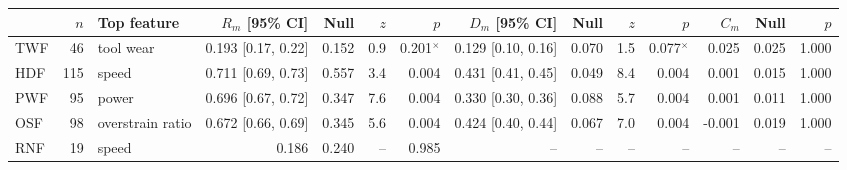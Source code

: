 \begin{tabular}{@{}lrlrrrrrrrrrrr@{}}
\toprule
& $n$ & Top feature & $R_m$ [95\% CI] & Null & $z$ & $p$ & $D_m$ [95\% CI] & Null & $z$ & $p$ & $C_m$ & Null & $p$ \\
\midrule
TWF & 46 & tool wear & 0.193 [0.17, 0.22] & 0.152 & 0.9 & 0.201$^{\times}$ & 0.129 [0.10, 0.16] & 0.070 & 1.5 & 0.077$^{\times}$ & 0.025 & 0.025 & 1.000 \\
HDF & 115 & speed & 0.711 [0.69, 0.73] & 0.557 & 3.4 & 0.004 & 0.431 [0.41, 0.45] & 0.049 & 8.4 & 0.004 & 0.001 & 0.015 & 1.000 \\
PWF & 95 & power & 0.696 [0.67, 0.72] & 0.347 & 7.6 & 0.004 & 0.330 [0.30, 0.36] & 0.088 & 5.7 & 0.004 & 0.001 & 0.011 & 1.000 \\
OSF & 98 & overstrain ratio & 0.672 [0.66, 0.69] & 0.345 & 5.6 & 0.004 & 0.424 [0.40, 0.44] & 0.067 & 7.0 & 0.004 & -0.001 & 0.019 & 1.000 \\
RNF & 19 & speed & 0.186 & 0.240 & -- & 0.985 & -- & -- & -- & -- & -- & -- & -- \\
\bottomrule
\end{tabular}
